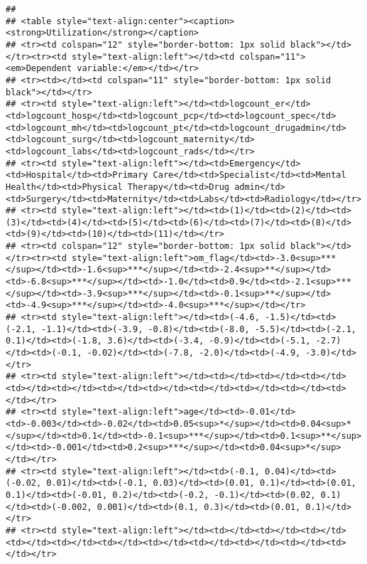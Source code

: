 \documentclass[]{article}
\begin{document}
\begin{verbatim}
## 
## <table style="text-align:center"><caption><strong>Utilization</strong></caption>
## <tr><td colspan="12" style="border-bottom: 1px solid black"></td></tr><tr><td style="text-align:left"></td><td colspan="11"><em>Dependent variable:</em></td></tr>
## <tr><td></td><td colspan="11" style="border-bottom: 1px solid black"></td></tr>
## <tr><td style="text-align:left"></td><td>logcount_er</td><td>logcount_hosp</td><td>logcount_pcp</td><td>logcount_spec</td><td>logcount_mh</td><td>logcount_pt</td><td>logcount_drugadmin</td><td>logcount_surg</td><td>logcount_maternity</td><td>logcount_labs</td><td>logcount_rads</td></tr>
## <tr><td style="text-align:left"></td><td>Emergency</td><td>Hospital</td><td>Primary Care</td><td>Specialist</td><td>Mental Health</td><td>Physical Therapy</td><td>Drug admin</td><td>Surgery</td><td>Maternity</td><td>Labs</td><td>Radiology</td></tr>
## <tr><td style="text-align:left"></td><td>(1)</td><td>(2)</td><td>(3)</td><td>(4)</td><td>(5)</td><td>(6)</td><td>(7)</td><td>(8)</td><td>(9)</td><td>(10)</td><td>(11)</td></tr>
## <tr><td colspan="12" style="border-bottom: 1px solid black"></td></tr><tr><td style="text-align:left">om_flag</td><td>-3.0<sup>***</sup></td><td>-1.6<sup>***</sup></td><td>-2.4<sup>**</sup></td><td>-6.8<sup>***</sup></td><td>-1.0</td><td>0.9</td><td>-2.1<sup>***</sup></td><td>-3.9<sup>***</sup></td><td>-0.1<sup>**</sup></td><td>-4.9<sup>***</sup></td><td>-4.0<sup>***</sup></td></tr>
## <tr><td style="text-align:left"></td><td>(-4.6, -1.5)</td><td>(-2.1, -1.1)</td><td>(-3.9, -0.8)</td><td>(-8.0, -5.5)</td><td>(-2.1, 0.1)</td><td>(-1.8, 3.6)</td><td>(-3.4, -0.9)</td><td>(-5.1, -2.7)</td><td>(-0.1, -0.02)</td><td>(-7.8, -2.0)</td><td>(-4.9, -3.0)</td></tr>
## <tr><td style="text-align:left"></td><td></td><td></td><td></td><td></td><td></td><td></td><td></td><td></td><td></td><td></td><td></td></tr>
## <tr><td style="text-align:left">age</td><td>-0.01</td><td>-0.003</td><td>-0.02</td><td>0.05<sup>*</sup></td><td>0.04<sup>*</sup></td><td>0.1</td><td>-0.1<sup>***</sup></td><td>0.1<sup>**</sup></td><td>-0.001</td><td>0.2<sup>***</sup></td><td>0.04<sup>*</sup></td></tr>
## <tr><td style="text-align:left"></td><td>(-0.1, 0.04)</td><td>(-0.02, 0.01)</td><td>(-0.1, 0.03)</td><td>(0.01, 0.1)</td><td>(0.01, 0.1)</td><td>(-0.01, 0.2)</td><td>(-0.2, -0.1)</td><td>(0.02, 0.1)</td><td>(-0.002, 0.001)</td><td>(0.1, 0.3)</td><td>(0.01, 0.1)</td></tr>
## <tr><td style="text-align:left"></td><td></td><td></td><td></td><td></td><td></td><td></td><td></td><td></td><td></td><td></td><td></td></tr>

\end{verbatim}
\end{document}

